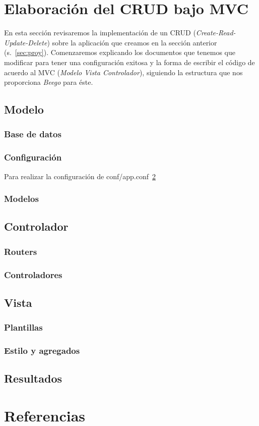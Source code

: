 \documentclass[12pt]{article}
\begin{document}
\section{Elaboración del CRUD bajo MVC}
En esta sección revisaremos la implementación de un CRUD (\textit{Create-Read-Update-Delete}) sobre la aplicación que creamos en la sección anterior (s.~\ref{sec:proy}). Comenzaremos explicando los documentos que tenemos que modificar para tener una configuración exitosa y la forma de escribir el código de acuerdo al MVC (\textit{Modelo Vista Controlador}), siguiendo la estructura que nos proporciona \textit{Beego} para éste.

\subsection{Modelo}
\subsubsection*{Base de datos}
\subsubsection*{Configuración}
Para realizar la configuración de conf/app.conf~\ref{}
\subsubsection*{Modelos}

\subsection{Controlador}
\subsubsection*{Routers}
\subsubsection*{Controladores}

\subsection{Vista}
\subsubsection*{Plantillas}
\subsubsection*{Estilo y agregados}

\subsection{Resultados}

\section{Referencias}
\end{document}
